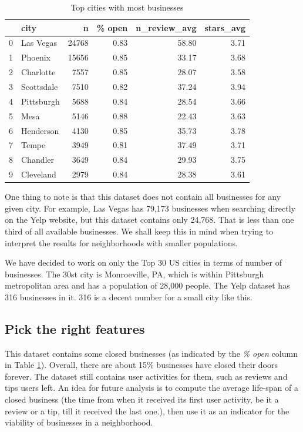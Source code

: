 \documentclass[draftclsnofoot]{IEEEtran}
\let\MYoriglatexcaption\caption
\renewcommand{\caption}[2][\relax]{\MYoriglatexcaption[#2]{#2}}
\begin{document}
\begin{table}[htbp]
\caption{Top cities with most businesses}
\label{city-biz-table}
\centering
\begin{tabular}{llrrrr}
\toprule
{} &        city &      n &  \% open &  n\_review\_avg &  stars\_avg \\
\midrule
0 &   Las Vegas &  24768 &    0.83 &         58.80 &       3.71 \\
1 &     Phoenix &  15656 &    0.85 &         33.17 &       3.68 \\
2 &   Charlotte &   7557 &    0.85 &         28.07 &       3.58 \\
3 &  Scottsdale &   7510 &    0.82 &         37.24 &       3.94 \\
4 &  Pittsburgh &   5688 &    0.84 &         28.54 &       3.66 \\
5 &        Mesa &   5146 &    0.88 &         22.43 &       3.63 \\
6 &   Henderson &   4130 &    0.85 &         35.73 &       3.78 \\
7 &       Tempe &   3949 &    0.81 &         37.49 &       3.71 \\
8 &    Chandler &   3649 &    0.84 &         29.93 &       3.75 \\
9 &   Cleveland &   2979 &    0.84 &         28.38 &       3.61 \\
\bottomrule
\end{tabular}
\end{table}

One thing to note is that this dataset does not contain all businesses for any given city. For example, Las Vegas has 79,173 businesses when searching directly on the Yelp website, but this dataset contains only 24,768. That is less than one third of all available businesses. We shall keep this in mind when trying to interpret the results for neighborhoods with smaller populations.

We have decided to work on only the Top 30 US cities in terms of number of businesses. The 30st city is Monroeville, PA, which is within Pittsburgh metropolitan area and has a population of 28,000 people. The Yelp dataset has 316 businesses in it. 316 is a decent number for a small city like this.

\subsection{Pick the right features}

This dataset contains some closed businesses (as indicated by the \textit{\% open} column in Table \ref{city-biz-table}). Overall, there are about 15\% businesses have closed their doors forever. The dataset still contains user activities for them, such as reviews and tips users left. An idea for future analysis is to compute the average life-span of a closed business (the time from when it received its first user activity, be it a review or a tip, till it received the last one.), then use it as an indicator for the viability of businesses in a neighborhood.
\end{document}
